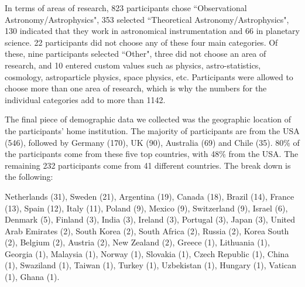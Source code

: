 In terms of areas of research, 823 participants chose ``Observational Astronomy/Astrophysics", 353 selected ``Theoretical Astronomy/Astrophysics", 130 indicated that they work in astronomical instrumentation and 66 in planetary science. 22 participants did not choose any of these four main categories. Of these, nine participants selected ``Other", three did not choose an area of research, and 10 entered custom values such as physics, astro-statistics, cosmology, astroparticle physics, space physics, etc. Participants were allowed to choose more than one area of research, which is why the numbers for the individual categories add to more than 1142. 

The final piece of demographic data we collected was the geographic location of the participants' home institution. The majority of participants are from the USA (546), followed by Germany (170), UK (90), Australia (69) and Chile (35). 80\% of the participants come from these five top countries, with 48\% from the USA. The remaining 232 participants come from 41 different countries. The break down is the following:

             Netherlands     (31),
                  Sweden     (21),
               Argentina     (19),
                  Canada     (18),
                  Brazil     (14),
                  France     (13),
                   Spain     (12),
                   Italy     (11),
                  Poland      (9),
                  Mexico      (9),
             Switzerland      (9),
                  Israel      (6),
                 Denmark      (5),
                 Finland      (3),
                   India      (3),
                 Ireland      (3),
                Portugal      (3),
                   Japan      (3),
    United Arab Emirates      (2),
             South Korea      (2),
            South Africa      (2),
                  Russia      (2),
             Korea South      (2),
                 Belgium      (2),
                 Austria      (2),
             New Zealand      (2),
                  Greece      (1),
               Lithuania      (1),
                 Georgia      (1),
                Malaysia      (1),
                  Norway      (1),
                Slovakia      (1),
          Czech Republic      (1),
                   China      (1),
               Swaziland      (1),
                  Taiwan      (1),
                  Turkey      (1),
              Uzbekistan      (1),
                 Hungary      (1),
                Vatican       (1),
                   Ghana      (1).
                   

